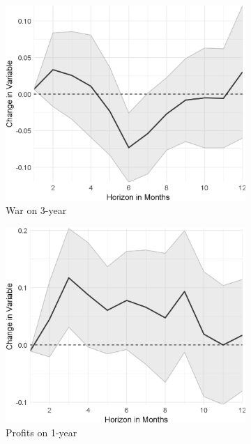 \begin{figure}[H]
\begin{subfigure}{00.32\textwidth}
		\includegraphics[width=1\textwidth]{output/lp/baseline/bHP/war/waronexpectations3y_djn.eps}
		\caption{War on 3-year}
	\end{subfigure}
	\begin{subfigure}{00.32\textwidth}
		\includegraphics[width=1\textwidth]{output/lp/baseline/bHP/profits/profitsonexpectations1y_djn.eps}
		\caption{Profits on 1-year}
	\end{subfigure}
	\begin{subfigure}{00.32\textwidth}

\end{subfigure}
\end{figure}
